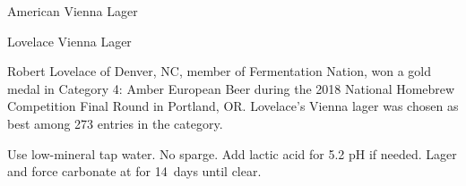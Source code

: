 \begin{recipie}{American Vienna Lager}
\begin{ingredientsblock}
\begin{yeasts}
\end{yeasts}

\end{ingredientsblock}

\begin{recipie}{Lovelace Vienna Lager}

\begin{aboutblock}
Robert Lovelace of Denver, NC, member of Fermentation Nation, won a gold medal in
Category 4: Amber European Beer during the 2018 National Homebrew Competition Final
Round in Portland, OR. Lovelace's Vienna lager was chosen as best among 273 entries
in the category.
\end{aboutblock}


\begin{methodandtiming}
 
\begin{mashsteps}
\end{mashsteps}

\begin{fermentationsteps}
\end{fermentationsteps}

\begin{directions}
Use low-mineral tap water. No sparge. Add lactic acid for 5.2 pH if needed. Lager and
force carbonate at  for 14~days until clear.
\end{directions}

\end{methodandtiming}

\pagebreak

\begin{ingredientsblock}

\begin{malts}
\end{malts}

\begin{hops}
\end{hops}

\begin{yeasts}
\end{yeasts}

\end{ingredientsblock}

\end{recipie}

\end{recipie}
